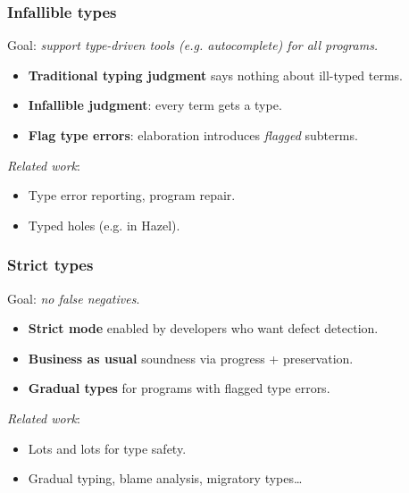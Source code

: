 \documentclass[aspectratio=169]{beamer}
\begin{document}
\begin{frame}

\frametitle{Infallible types}

Goal: \emph{support type-driven tools (e.g. autocomplete) for all programs.}
\begin{itemize}
\item \textbf{Traditional typing judgment} says nothing about ill-typed terms.
\item \textbf{Infallible judgment}: every term gets a type.
\item \textbf{Flag type errors}: elaboration introduces \emph{flagged} subterms.
\end{itemize}

\emph{Related work}:
\begin{itemize}
\item Type error reporting, program repair.
\item Typed holes (e.g. in Hazel).
\end{itemize}

\end{frame}

\begin{frame}

\frametitle{Strict types}

Goal: \emph{no false negatives}.

\begin{itemize}
\item \textbf{Strict mode} enabled by developers who want defect detection.
\item \textbf{Business as usual} soundness via progress + preservation.
\item \textbf{Gradual types} for programs with flagged type errors.
\end{itemize}

\emph{Related work}:
\begin{itemize}
\item Lots and lots for type safety.
\item Gradual typing, blame analysis, migratory types\dots
\end{itemize}

\end{frame}
\end{document}
